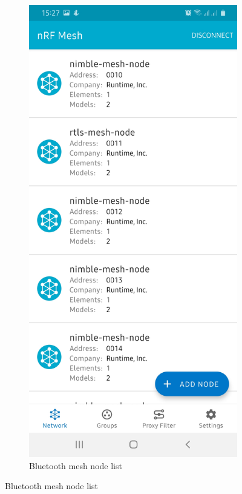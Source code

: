 \documentclass[\main/main.tex]{subfiles}
\begin{document}
\begin{figure}[H]
    \centering
    \begin{subfigure}[b]{0.4\linewidth}
        \centering
        \includegraphics[width=0.9\linewidth]{nRF_Mesh_04.jpg}
        \caption{Bluetooth mesh node list}
    \end{subfigure}

\end{figure}
\end{document}
